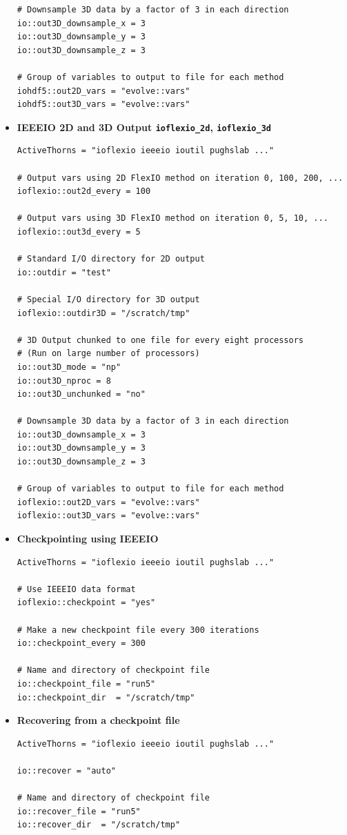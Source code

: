 \documentclass{article}
\begin{document}
\begin{itemize}
\begin{verbatim}
# Downsample 3D data by a factor of 3 in each direction
io::out3D_downsample_x = 3
io::out3D_downsample_y = 3
io::out3D_downsample_z = 3

# Group of variables to output to file for each method
iohdf5::out2D_vars = "evolve::vars"
iohdf5::out3D_vars = "evolve::vars"
\end{verbatim}


\item{\bf IEEEIO 2D and 3D Output {\tt ioflexio\_2d}, {\tt ioflexio\_3d}}
\begin{verbatim}
ActiveThorns = "ioflexio ieeeio ioutil pughslab ..."

# Output vars using 2D FlexIO method on iteration 0, 100, 200, ...
ioflexio::out2d_every = 100            

# Output vars using 3D FlexIO method on iteration 0, 5, 10, ...
ioflexio::out3d_every = 5

# Standard I/O directory for 2D output
io::outdir = "test"

# Special I/O directory for 3D output
ioflexio::outdir3D = "/scratch/tmp"

# 3D Output chunked to one file for every eight processors
# (Run on large number of processors)
io::out3D_mode = "np"
io::out3D_nproc = 8
io::out3D_unchunked = "no"

# Downsample 3D data by a factor of 3 in each direction
io::out3D_downsample_x = 3
io::out3D_downsample_y = 3
io::out3D_downsample_z = 3

# Group of variables to output to file for each method
ioflexio::out2D_vars = "evolve::vars"
ioflexio::out3D_vars = "evolve::vars"
\end{verbatim}

\item{\bf Checkpointing using IEEEIO}
\begin{verbatim}
ActiveThorns = "ioflexio ieeeio ioutil pughslab ..."

# Use IEEEIO data format 
ioflexio::checkpoint = "yes"

# Make a new checkpoint file every 300 iterations
io::checkpoint_every = 300

# Name and directory of checkpoint file
io::checkpoint_file = "run5"
io::checkpoint_dir  = "/scratch/tmp"
\end{verbatim}

\item{\bf Recovering from a checkpoint file}
\begin{verbatim}
ActiveThorns = "ioflexio ieeeio ioutil pughslab ..."

io::recover = "auto"

# Name and directory of checkpoint file
io::recover_file = "run5"
io::recover_dir  = "/scratch/tmp"
\end{verbatim}

\end{itemize}
\end{document}
